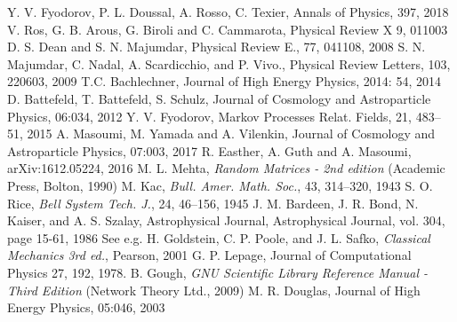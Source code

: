 \documentclass[12pt]{article}
\begin{document}
\begin{thebibliography}{99}
 Y. V. Fyodorov, P. L. Doussal, A. Rosso, C. Texier, Annals of Physics, 397, 2018
  V. Ros, G. B. Arous, G. Biroli and C. Cammarota, Physical Review X 9, 011003
 D. S. Dean and S. N. Majumdar, Physical Review E., 77, 041108, 2008
 S. N. Majumdar, C. Nadal, A. Scardicchio, and P. Vivo., Physical Review Letters, 103, 220603, 2009
 T.C. Bachlechner, Journal of High Energy Physics, 2014: 54, 2014
 D. Battefeld, T. Battefeld, S. Schulz, Journal of Cosmology and Astroparticle Physics, 06:034, 2012
 Y. V. Fyodorov, Markov Processes Relat. Fields, 21, 483--51, 2015
 A. Masoumi, M. Yamada and A. Vilenkin, Journal of Cosmology and Astroparticle Physics, 07:003, 2017
 R. Easther, A. Guth and A. Masoumi, arXiv:1612.05224, 2016
 M. L. Mehta, \emph{Random Matrices - 2nd edition} (Academic Press, Bolton, 1990)
 M. Kac, \emph{Bull. Amer. Math. Soc.}, 43, 314–320, 1943
  S. O. Rice, \emph{Bell System Tech. J.}, 24, 46--156, 1945
 J. M. Bardeen, J. R. Bond, N. Kaiser, and A. S. Szalay, Astrophysical Journal, Astrophysical Journal, vol. 304, page 15-61, 1986
 See e.g. H. Goldstein, C. P. Poole, and J. L. Safko, \emph{Classical Mechanics 3rd ed.}, Pearson, 2001
 G. P. Lepage, Journal of Computational Physics 27, 192, 1978.
 B. Gough, \emph{GNU Scientific Library Reference Manual - Third Edition} (Network Theory Ltd., 2009)
 M. R. Douglas, Journal of High Energy Physics, 05:046, 2003
\end{thebibliography}
\end{document}
